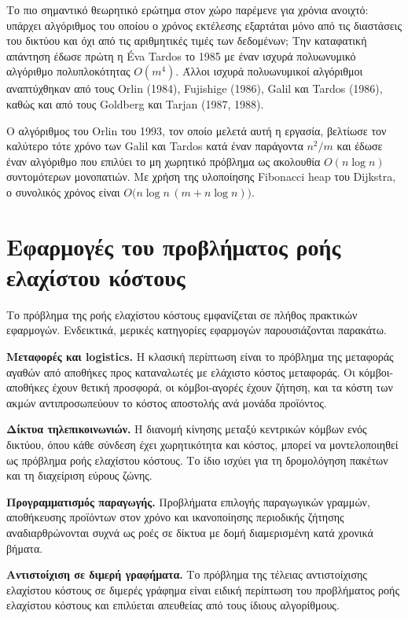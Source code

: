 \documentclass[11pt,a4paper,oneside]{report}
\begin{document}
Το πιο σημαντικό θεωρητικό ερώτημα στον χώρο παρέμενε για χρόνια ανοιχτό: υπάρχει αλγόριθμος του οποίου ο χρόνος εκτέλεσης εξαρτάται μόνο από τις διαστάσεις του δικτύου και όχι από τις αριθμητικές τιμές των δεδομένων; Την καταφατική απάντηση έδωσε πρώτη η \textenglish{Éva Tardos} το 1985 με έναν ισχυρά πολυωνυμικό αλγόριθμο πολυπλοκότητας $O(m^4)$. Άλλοι ισχυρά πολυωνυμικοί αλγόριθμοι αναπτύχθηκαν από τους \textenglish{Orlin} (1984), \textenglish{Fujishige} (1986), \textenglish{Galil} και \textenglish{Tardos} (1986), καθώς και από τους \textenglish{Goldberg} και \textenglish{Tarjan} (1987, 1988).

Ο αλγόριθμος του \textenglish{Orlin} του 1993, τον οποίο μελετά αυτή η εργασία, βελτίωσε τον καλύτερο τότε χρόνο των \textenglish{Galil} και \textenglish{Tardos} κατά έναν παράγοντα $n^2/m$ και έδωσε έναν αλγόριθμο που επιλύει το μη χωρητικό πρόβλημα ως ακολουθία $O(n \log n)$ συντομότερων μονοπατιών. Με χρήση της υλοποίησης \textenglish{Fibonacci heap} του \textenglish{Dijkstra}, ο συνολικός χρόνος είναι $O\bigl(n \log n \,(m + n \log n)\bigr)$.

\section{Εφαρμογές του προβλήματος ροής ελαχίστου κόστους}

Το πρόβλημα της ροής ελαχίστου κόστους εμφανίζεται σε πλήθος πρακτικών εφαρμογών. Ενδεικτικά, μερικές κατηγορίες εφαρμογών παρουσιάζονται παρακάτω.

\textbf{Μεταφορές και \textenglish{logistics}.} Η κλασική περίπτωση είναι το πρόβλημα της μεταφοράς αγαθών από αποθήκες προς καταναλωτές με ελάχιστο κόστος μεταφοράς. Οι κόμβοι-αποθήκες έχουν θετική προσφορά, οι κόμβοι-αγορές έχουν ζήτηση, και τα κόστη των ακμών αντιπροσωπεύουν το κόστος αποστολής ανά μονάδα προϊόντος.

\textbf{Δίκτυα τηλεπικοινωνιών.} Η διανομή κίνησης μεταξύ κεντρικών κόμβων ενός δικτύου, όπου κάθε σύνδεση έχει χωρητικότητα και κόστος, μπορεί να μοντελοποιηθεί ως πρόβλημα ροής ελαχίστου κόστους. Το ίδιο ισχύει για τη δρομολόγηση πακέτων και τη διαχείριση εύρους ζώνης.

\textbf{Προγραμματισμός παραγωγής.} Προβλήματα επιλογής παραγωγικών γραμμών, αποθήκευσης προϊόντων στον χρόνο και ικανοποίησης περιοδικής ζήτησης αναδιαρθρώνονται συχνά ως ροές σε δίκτυα με δομή διαμερισμένη κατά χρονικά βήματα.

\textbf{Αντιστοίχιση σε διμερή γραφήματα.} Το πρόβλημα της τέλειας αντιστοίχισης ελαχίστου κόστους σε διμερές γράφημα είναι ειδική περίπτωση του προβλήματος ροής ελαχίστου κόστους και επιλύεται απευθείας από τους ίδιους αλγορίθμους.
\end{document}
